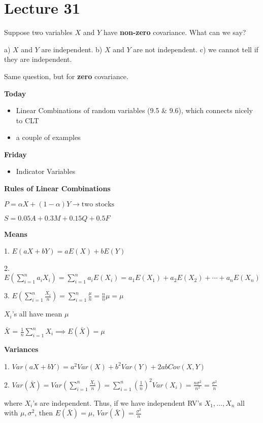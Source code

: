 \section{Lecture 31}

Suppose two variables $ X $ and $ Y $ have \textbf{non-zero} covariance.
What can we say?

a) $ X $ and $ Y $ are independent. b) $ X $ and $ Y $ are not independent.
c) we cannot tell if they are independent.

Same question, but for \textbf{zero} covariance.

\textbf{Today}
\begin{itemize}
    \item Linear Combinations of random variables
 (9.5 \& 9.6), which connects nicely to CLT
    \item a couple of examples
\end{itemize}

\textbf{Friday}
\begin{itemize}
    \item Indicator Variables
\end{itemize}

\textbf{Rules of Linear Combinations}

$ P=\alpha X+(1-\alpha)Y\rightarrow\text{two stocks} $

$ S=0.05A+0.3M+0.15Q+0.5F $

\textbf{Means}

1. $ E(aX+bY)=aE(X)+bE(Y) $

2. $ E\left(\sum\limits_{i=1}^{n} a_iX_i\right)=\sum\limits_{i=1}^{n}a_i E(X_i)=
a_1E(X_1)+a_2E(X_2)+\cdots +a_nE(X_n) $

3. $ E\left(\sum\limits_{i=1}^{n} \frac{X_i}{n}\right)=\sum\limits_{i=1}^{n}\frac{\mu}{n}=\frac{n}{n} \mu=\mu $

$ X_i $'s all have mean $ \mu $

$ \bar{X} $ = $ \frac{1}{n} \sum\limits_{i=1}^{n} X_i\implies E(\bar{X})=\mu $

\textbf{Variances}

1. $ Var(aX+bY)=a^2Var(X)+b^2Var(Y)+2abCov(X,Y) $

2. $ Var(\bar{X})=Var\left(\sum\limits_{i=1}^{n} \frac{X_i}{n}\right)=\sum\limits_{i=1}^{n}\left( \frac{1}{n}  \right)^2
Var(X_i)=\frac{n\sigma^2}{n^2}=\frac{\sigma^2}{n} $

where $ X_i $'s are independent. Thus, if we have independent RV's
$ X_1,\ldots,X_n $ all with $ \mu,\sigma^2 $, then $ E(\bar{X})=\mu $,
$ Var(\bar{X})=\frac{\sigma^2}{n} $

